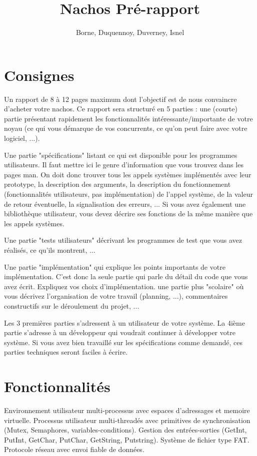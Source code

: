 \documentclass[11pt]{article}
\author{Borne, Duquennoy, Duverney, Isnel}
\date{}
\title{Nachos Pré-rapport}
\begin{document}
\maketitle
\section{Consignes}
Un rapport de 8 à 12 pages maximum dont l'objectif est de nous convaincre d'acheter votre nachos. Ce rapport sera structuré en 5 parties :
une (courte) partie présentant rapidement les fonctionnalités intéressante/importante de votre noyau (ce qui vous démarque de vos concurrents, ce qu'on peut faire avec votre logiciel, ...).

Une partie "spécifications" listant ce qui est disponible pour les programmes utilisateurs.
Il faut mettre ici le genre d'information que vous trouvez dans les pages man.
On doit donc trouver tous les appels systèmes implémentés avec leur prototype, la description des arguments,
la description du fonctionnement (fonctionnalités utilisateurs, pas implémentation) de l'appel système,
de la valeur de retour éventuelle, la signalisation des erreurs, ...
Si vous avez également une bibliothèque utilisateur, vous devez décrire ses fonctions de la même manière que les appels systèmes.

Une partie "tests utilisateurs" décrivant les programmes de test que vous avez réalisés, ce qu'ils montrent, ...

Une partie "implémentation" qui explique les points importants de votre implémentation. C'est donc la seule partie qui parle du détail du code que vous avez écrit. Expliquez vos choix d'implémentation.
une partie plus "scolaire" où vous décrivez l'organisation de votre travail (planning, ...), commentaires constructifs sur le déroulement du projet, ...

Les 3 premières parties s'adressent à un utilisateur de votre système. La 4ième partie s'adresse à un développeur qui voudrait continuer à développer votre système. Si vous avez bien travaillé sur les spécifications comme demandé, ces parties techniques seront faciles à écrire.

\section{Fonctionnalités}

Environnement utilisateur multi-processus avec espaces d'adressages et memoire virtuelle.
Processus utilisateur multi-threadés avec primitives de synchronisation (Mutex, Semaphores, variables-conditions).
Gestion des entrées-sorties (GetInt, PutInt, GetChar, PutChar, GetString, Putstring).
Système de fichier type FAT.
Protocole réseau avec envoi fiable de données.
\end{document}
